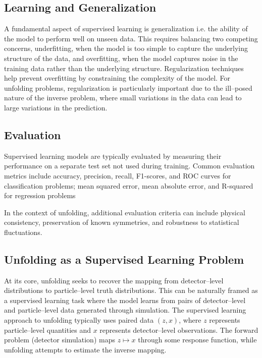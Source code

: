     \subsection{Learning and Generalization}
        A fundamental aspect of supervised learning is generalization i.e. the ability of the model to perform well on unseen data.
        This requires balancing two competing concerns, underfitting, when the model is too simple to capture the underlying structure of the data, and overfitting, when the model captures noise in the training data rather than the underlying structure.
        Regularization techniques help prevent overfitting by constraining the complexity of the model.
        For unfolding problems, regularization is particularly important due to the ill--posed nature of the inverse problem, where small variations in the data can lead to large variations in the prediction.
    \subsection{Evaluation}
        Supervised learning models are typically evaluated by measuring their performance on a separate test set not used during training.
        Common evaluation metrics include accuracy, precision, recall, F1-scores, and ROC curves for classification problems; mean squared error, mean absolute error, and R-squared for regression problems

        In the context of unfolding, additional evaluation criteria can include physical consistency, preservation of known symmetries, and robustness to statistical fluctuations.
    \subsection{Unfolding as a Supervised Learning Problem}
        At its core, unfolding seeks to recover the mapping from detector--level distributions to particle--level truth distributions.
        This can be naturally framed as a supervised learning task where the model learns from pairs of detector--level and particle--level data generated through simulation.
        The supervised learning approach to unfolding typically uses paired data \((z, x)\), where \(z\) represents particle--level quantities and \(x\) represents detector--level observations.
        The forward problem (detector simulation) maps \(z \mapsto x\) through some response function, while unfolding attempts to estimate the inverse mapping.

